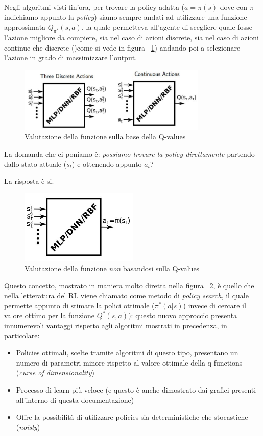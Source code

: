 Negli algoritmi visti fin'ora, per trovare la policy adatta ($a = \pi(s)$ dove con $\pi$ indichiamo appunto la \textit{policy}) siamo sempre andati ad utilizzare una funzione approssimata $Q_{\pi^*}(s,a)$, la quale permetteva all'agente di scegliere quale fosse l'azione migliore da compiere, sia nel caso di azioni discrete, sia nel caso di azioni continue che discrete ()come si vede in figura ~\ref{fig:Q_function_utility}) andando poi a selezionare l'azione in grado di massimizzare l'output.

\begin{figure}[!h]
	\centering
	\includegraphics[width=0.8\textwidth]{Immagini/Q_function_utility.JPG}
	\caption{Valutazione della funzione sulla base della Q-values}
	\label{fig:Q_function_utility}
\end{figure}

La domanda che ci poniamo è: \textit{possiamo trovare la policy direttamente} partendo dallo stato attuale ($s_t$) e ottenendo appunto $a_t$?

La risposta è si.

\begin{figure}[!h]
	\centering
	\includegraphics[width=0.5\textwidth]{Immagini/No_Q_function.JPG}
	\caption{Valutazione della funzione \textit{non} basandosi sulla Q-values}
	\label{fig:NO_Q_function_utility}
\end{figure}
Questo concetto, mostrato in maniera molto diretta nella figura ~\ref{fig:NO_Q_function_utility}, è quello che nella letteratura del RL viene chiamato come metodo di \textit{policy search}, il quale permette appunto di stimare la polici ottimale ($\pi^*(a|s)$) invece di cercare il valore ottimo per la funzione $Q^*(s,a))$: questo nuovo approccio presenta innumerevoli vantaggi rispetto agli algoritmi mostrati in precedenza, in particolare:
\begin{itemize}
	\item Policies ottimali, scelte tramite algoritmi di questo tipo, presentano un numero di parametri minore rispetto al valore ottimale della q-functions (\textit{curse of dimensionality})
	\item Processo di learn più veloce (e questo è anche dimostrato dai grafici presenti all'interno di questa documentazione)
	\item Offre la possibilità di utilizzare policies sia deterministiche che stocastiche (\textit{noisly})
\end{itemize}

